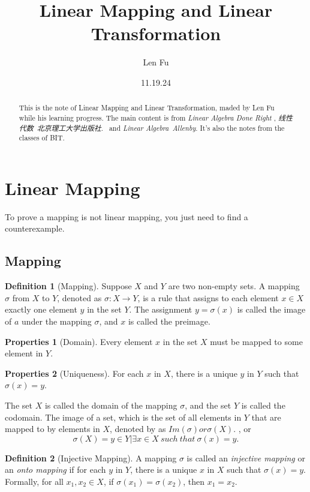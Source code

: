 \documentclass{article}
\title{Linear Mapping and Linear Transformation}
\author{Len Fu}
\date{11.19.24}
\theoremstyle{definition}
\newtheorem{defi}{Definition}[section]
\newtheorem{pro}{Properties}[section]
\begin{document}
\maketitle

\begin{abstract}
This is the note of Linear Mapping and Linear Transformation, maded by Len Fu while his learning progress. 
The main content is from \textit{Linear Algebra Done Right} , \textit{线性代数\ 北京理工大学出版社}.
\ and \textit{Linear Algebra\  Allenby}. It's also the notes from the classes of BIT.
\end{abstract}


\tableofcontents
\newpage

\section{Linear Mapping}
To prove a mapping is not linear mapping, you just need to find a counterexample.
\subsection{Mapping}
\begin{defi}[Mapping]
Suppose $X$ and $Y$ are two non-empty sets. A mapping $\sigma$
from $X$ to $Y$, denoted as $\sigma:X\rightarrow Y$, is a rule 
that assigns to each element $x\in X$ exactly one element $y$ 
in the set $Y$. The assignment $y=\sigma(x)$ is called the image of $a$
under the mapping $\sigma$, and $x$ is called the preimage. 
\end{defi}
\begin{pro}[Domain]
    Every element $x$ in the set $X$ must be mapped to some element in $Y$.
\end{pro}
\begin{pro}[Uniqueness]
    For each $x$ in $X$, there is a unique $y$ in $Y$ 
    such that $\sigma(x)=y$.
\end{pro}

The set $X$ is called the domain of the mapping $\sigma$, 
and the set $Y$ is called the codomain. The image of a set,
which is the set of all elements in $Y$ that are mapped 
to by elements in $X$, denoted by as $Im(\sigma) or \sigma(X)$.
, or $$\sigma(X)={y\in Y|\exists x\in X\ such\ that\ \sigma(x)=y}.$$

\begin{defi}[Injective Mapping]
    A mapping $\sigma$ is called an \textit{injective mapping} or an \textit{onto mapping}
    if for each $y$ in $Y$, there is a unique $x$ in $X$ such that $\sigma(x)=y$.
    Formally, for all $x_{1},x_{2}\in X$, if $\sigma(x_{1})=\sigma(x_{2})$, 
    then $x_{1}=x_{2}$.
\end{defi}
\end{document}
